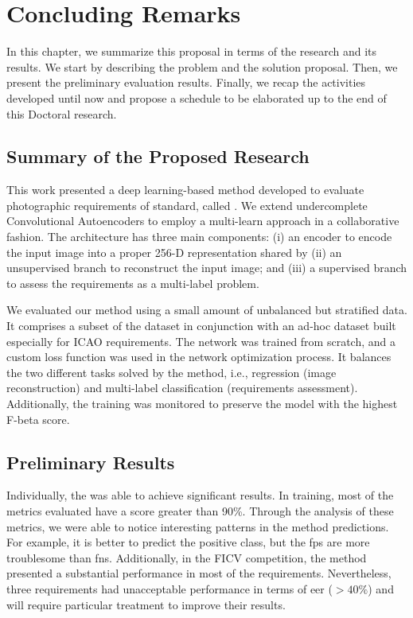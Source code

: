 \section{Concluding Remarks}

In this chapter, we summarize this proposal in terms of the research and its results. We start by describing the problem and the solution proposal. Then, we present the preliminary evaluation results. Finally, we recap the activities developed until now and propose a schedule to be elaborated up to the end of this Doctoral research.

\subsection{Summary of the Proposed Research}

This work presented a deep learning-based method developed to evaluate photographic requirements of \icao standard, called \methodname. We extend undercomplete Convolutional Autoencoders to employ a multi-learn approach in a collaborative fashion. The architecture has three main components: (i) an encoder to encode the input image into a proper 256-D representation shared by (ii) an unsupervised branch to reconstruct the input image; and (iii) a supervised branch to assess the requirements as a multi-label problem. 

We evaluated our method using a small amount of unbalanced but stratified data. It comprises a subset of the \ficvtest dataset in conjunction with an ad-hoc dataset built especially for ICAO requirements. The network was trained from scratch, and a custom loss function was used in the network optimization process. It balances the two different tasks solved by the method, i.e., regression (image reconstruction) and multi-label classification (requirements assessment). Additionally, the training was monitored to preserve the model with the highest F-beta score.

\subsection{Preliminary Results}

Individually, the \methodname was able to achieve significant results. In training, most of the metrics evaluated have a score greater than 90\%. Through the analysis of these metrics, we were able to notice interesting patterns in the method predictions. For example, it is better to predict the positive class, but the \aclp{fp} are more troublesome than \aclp{fn}. Additionally, in the FICV competition, the method presented a substantial performance in most of the requirements. Nevertheless, three requirements had unacceptable performance in terms of \acs{eer} ($> 40\%$) and will require particular treatment to improve their results.

